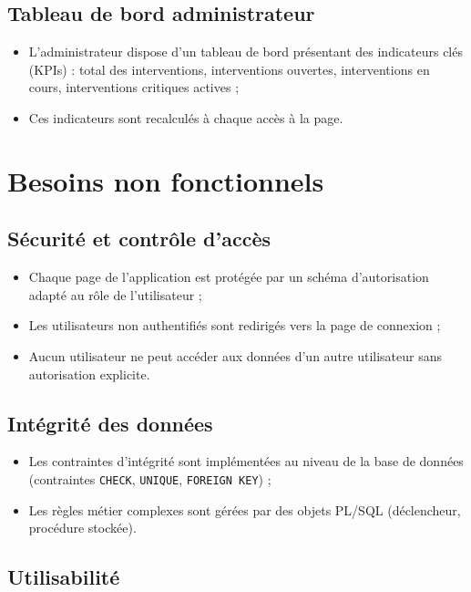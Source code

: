 \documentclass[12pt,a4paper,oneside]{report}
\begin{document}
\subsection{Tableau de bord administrateur}

\begin{itemize}[leftmargin=2em]
  \item L'administrateur dispose d'un tableau de bord présentant des indicateurs clés (KPIs) : total des interventions, interventions ouvertes, interventions en cours, interventions critiques actives ;
  \item Ces indicateurs sont recalculés à chaque accès à la page.
\end{itemize}

\section{Besoins non fonctionnels}

\subsection{Sécurité et contrôle d'accès}

\begin{itemize}[leftmargin=2em]
  \item Chaque page de l'application est protégée par un schéma d'autorisation adapté au rôle de l'utilisateur ;
  \item Les utilisateurs non authentifiés sont redirigés vers la page de connexion ;
  \item Aucun utilisateur ne peut accéder aux données d'un autre utilisateur sans autorisation explicite.
\end{itemize}

\subsection{Intégrité des données}

\begin{itemize}[leftmargin=2em]
  \item Les contraintes d'intégrité sont implémentées au niveau de la base de données (contraintes \texttt{CHECK}, \texttt{UNIQUE}, \texttt{FOREIGN KEY}) ;
  \item Les règles métier complexes sont gérées par des objets PL/SQL (déclencheur, procédure stockée).
\end{itemize}

\subsection{Utilisabilité}
\end{document}

